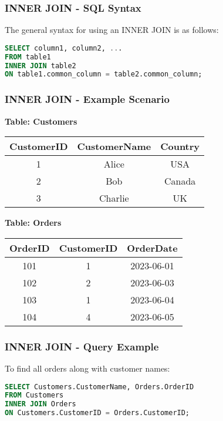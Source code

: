 \documentclass[aspectratio=169]{beamer}
\begin{document}
\begin{frame}[fragile]
    \frametitle{INNER JOIN - SQL Syntax}
    The general syntax for using an INNER JOIN is as follows:
    \begin{lstlisting}[language=SQL]
SELECT column1, column2, ...
FROM table1
INNER JOIN table2
ON table1.common_column = table2.common_column;
    \end{lstlisting}
\end{frame}

\begin{frame}[fragile]
    \frametitle{INNER JOIN - Example Scenario}
    \textbf{Table: Customers}
    \begin{center}
        \begin{tabular}{|c|c|c|}
            \hline
            CustomerID & CustomerName & Country \\
            \hline
            1 & Alice & USA \\
            2 & Bob & Canada \\
            3 & Charlie & UK \\
            \hline
        \end{tabular}
    \end{center}
    
    \textbf{Table: Orders}
    \begin{center}
        \begin{tabular}{|c|c|c|}
            \hline
            OrderID & CustomerID & OrderDate \\
            \hline
            101 & 1 & 2023-06-01 \\
            102 & 2 & 2023-06-03 \\
            103 & 1 & 2023-06-04 \\
            104 & 4 & 2023-06-05 \\
            \hline
        \end{tabular}
    \end{center}
\end{frame}

\begin{frame}[fragile]
    \frametitle{INNER JOIN - Query Example}
    To find all orders along with customer names:
    \begin{lstlisting}[language=SQL]
SELECT Customers.CustomerName, Orders.OrderID
FROM Customers
INNER JOIN Orders
ON Customers.CustomerID = Orders.CustomerID;
    \end{lstlisting}
\end{frame}
\end{document}
